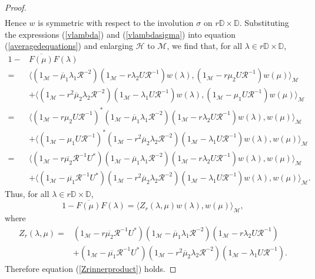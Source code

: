 \documentclass[12pt,reqno]{amsart}
\numberwithin{equation}{section}
\theoremstyle{definition}
\begin{document}
\begin{proof}
\begin{align}
\end{align}
Hence $w$ is symmetric with respect to the involution $\sigma$ on $r\mathbb{D}\times\mathbb{D}$. Substituting the expressions (\ref{vlambda}) and (\ref{vlambdasigma}) into equation (\ref{averagedequations}) and enlarging $\mathcal{H}$ to $\mathcal{M}$, we find that, for all $\lambda \in r\mathbb{D}\times\mathbb{D}$,
\begin{align*}
1-&\overline{F(\mu)}F(\lambda) \\
= &\Big\langle(1_{\mathcal{M}}-\overline{\mu}_{1}\lambda_{1}\mathcal{R}^{-2})(1_{\mathcal{M}}-r\lambda_{2}U\mathcal{R}^{-1}) w(\lambda),(1_{\mathcal{M}}-r\mu_{2}U\mathcal{R}^{-1})w(\mu)\Big\rangle_{\mathcal{M}}  \\
&+\Big\langle (1_{\mathcal{M}}-r^{2} \overline{\mu}_{2}\lambda_{2}\mathcal{R}^{-2})(1_{\mathcal{M}}-\lambda_{1}U\mathcal{R}^{-1}) w(\lambda), (1_{\mathcal{M}}-\mu_{1}U\mathcal{R}^{-1}) w(\mu) \Big\rangle_{\mathcal{M}}\\
= & \Big\langle(1_{\mathcal{M}}-r\mu_{2}U\mathcal{R}^{-1})^{*}(1_{\mathcal{M}}-\overline{\mu}_{1}\lambda_{1}\mathcal{R}^{-2})(1_{\mathcal{M}}-r\lambda_{2}U\mathcal{R}^{-1}) w(\lambda),w(\mu)\Big\rangle_{\mathcal{M}}  \\
&+\Big\langle (1_{\mathcal{M}}-\mu_{1}U\mathcal{R}^{-1})^{*}(1_{\mathcal{M}}-r^{2} \overline{\mu}_{2}\lambda_{2}\mathcal{R}^{-2})(1_{\mathcal{M}}-\lambda_{1}U\mathcal{R}^{-1}) w(\lambda), w(\mu) \Big\rangle_{\mathcal{M}}\\
= &\Big\langle(1_{\mathcal{M}}-r\overline{\mu_{2}}\mathcal{R}^{-1}U^{*})(1_{\mathcal{M}}-\overline{\mu}_{1}\lambda_{1}\mathcal{R}^{-2})(1_{\mathcal{M}}-r\lambda_{2}U\mathcal{R}^{-1})w(\lambda),w(\mu)\Big\rangle_{\mathcal{M}}  \\
&+\Big\langle (1_{\mathcal{M}}-\overline{\mu_{1}}\mathcal{R}^{-1}U^{*})(1_{\mathcal{M}}-r^{2} \overline{\mu}_{2}\lambda_{2}\mathcal{R}^{-2})(1_{\mathcal{M}}-\lambda_{1}U\mathcal{R}^{-1}) w(\lambda), w(\mu) \Big\rangle_{\mathcal{M}}.
\end{align*}
Thus, for all $\lambda \in r\mathbb{D}\times\mathbb{D}$,
$$ 1-\overline{F(\mu)}F(\lambda) = \langle Z_{r}(\lambda,\mu) w(\lambda),w(\mu)\rangle_{\mathcal{M}}, $$
where
\begin{align*}
Z_{r}(\lambda,\mu) =& (1_{\mathcal{M}}-r\overline{\mu_{2}}\mathcal{R}^{-1}U^{*})(1_{\mathcal{M}}-\overline{\mu}_{1}\lambda_{1}\mathcal{R}^{-2})(1_{\mathcal{M}}- r\lambda_{2}U\mathcal{R}^{-1}) \\
& + (1_{\mathcal{M}}-\overline{\mu_{1}}\mathcal{R}^{-1}U^{*})(1_{\mathcal{M}}-r^{2} \overline{\mu}_{2}\lambda_{2}\mathcal{R}^{-2})(1_{\mathcal{M}}-\lambda_{1}U\mathcal{R}^{-1}).
\end{align*}
Therefore equation (\ref{Zrinnerproduct}) holds.\end{proof}
\end{document}
